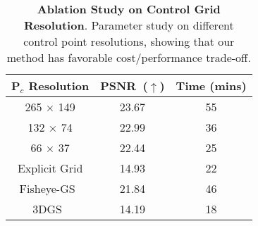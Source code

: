 \begin{table}[t]
\centering
\begin{tabular}{ccc}
\toprule
$\textbf{P}_c$ Resolution & PSNR~($\uparrow$)  & Time (mins) \\
\midrule
265 $\times$ 149 & 23.67 & 55 \\
132 $\times$ 74 & 22.99 & 36 \\
        66 $\times$ 37 & 22.44 & 25 \\
\midrule
Explicit Grid & 14.93 & 22 \\
Fisheye-GS~\cite{liao2024fisheye} & 21.84 & 46 \\
3DGS~\cite{kerbl20233d} & 14.19 & 18 \\
\bottomrule
\end{tabular}%
\caption{\textbf{Ablation Study on Control Grid Resolution}. Parameter study on different control point resolutions, showing that our method has favorable cost/performance trade-off.}
\label{tab:ablation_control_pts}%
\end{table}%
